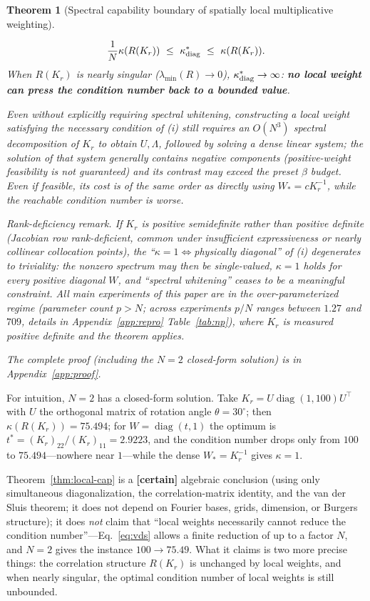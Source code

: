 \documentclass[11pt]{article}
\newcommand{\W}{W}
\DeclareMathOperator{\diag}{diag}
\newtheorem{theorem}{Theorem}[section]
\numberwithin{equation}{section}
\begin{document}
\begin{theorem}[Spectral capability boundary of spatially local multiplicative weighting]
\begin{description}[leftmargin=1.6em,itemsep=2pt]
\begin{equation}\label{eq:vds}
\frac1N\kappa(R(K_r))\ \le\ \kappa^*_{\rm diag}\ \le\ \kappa(R(K_r)).
\end{equation}
When $R(K_r)$ is nearly singular ($\lambda_{\min}(R)\to0$), $\kappa^*_{\rm diag}\to\infty$: \textbf{no local weight can press the condition number back to a bounded value}.
\item[(iv)~The computational cost of satisfying the necessary condition.] Even without explicitly requiring spectral whitening, constructing a local weight satisfying the necessary condition of (i) still requires an $O(N^3)$ spectral decomposition of $K_r$ to obtain $U,\Lambda$, followed by solving a dense linear system; the solution of that system generally contains negative components (positive-weight feasibility is not guaranteed) and its contrast may exceed the preset $\beta$ budget. Even if feasible, its cost is of the same order as directly using $\W_*=cK_r^{-1}$, while the reachable condition number is worse.\par\smallskip\noindent\emph{Rank-deficiency remark.} If $K_r$ is positive semidefinite rather than positive definite (Jacobian row rank-deficient, common under insufficient expressiveness or nearly collinear collocation points), the ``$\kappa=1\iff$physically diagonal'' of (i) degenerates to triviality: the nonzero spectrum may then be single-valued, $\kappa=1$ holds for every positive diagonal $\W$, and ``spectral whitening'' ceases to be a meaningful constraint. All main experiments of this paper are in the over-parameterized regime (parameter count $p>N$; across experiments $p/N$ ranges between $1.27$ and $709$, details in Appendix~\ref{app:repro} Table~\ref{tab:np}), where $K_r$ is measured positive definite and the theorem applies.
\end{description}
The complete proof (including the $N=2$ closed-form solution) is in Appendix~\ref{app:proof}.
\end{theorem}

\noindent For intuition, $N=2$ has a closed-form solution. Take $K_r=U\diag(1,100)U^\top$ with $U$ the orthogonal matrix of rotation angle $\theta=30^\circ$; then $\kappa(R(K_r))=75.494$; for $\W=\diag(t,1)$ the optimum is $t^*=(K_r)_{22}/(K_r)_{11}=2.9223$, and the condition number drops only from $100$ to $75.494$---nowhere near $1$---while the dense $\W_*=K_r^{-1}$ gives $\kappa=1$.

\noindent Theorem~\ref{thm:local-cap} is a \textbf{[certain]} algebraic conclusion (using only simultaneous diagonalization, the correlation-matrix identity, and the van der Sluis theorem; it does not depend on Fourier bases, grids, dimension, or Burgers structure); it does \emph{not} claim that ``local weights necessarily cannot reduce the condition number''---Eq.~\eqref{eq:vds} allows a finite reduction of up to a factor $N$, and $N=2$ gives the instance $100\to75.49$. What it claims is two more precise things: the correlation structure $R(K_r)$ is unchanged by local weights, and when nearly singular, the optimal condition number of local weights is still unbounded.
\end{document}

